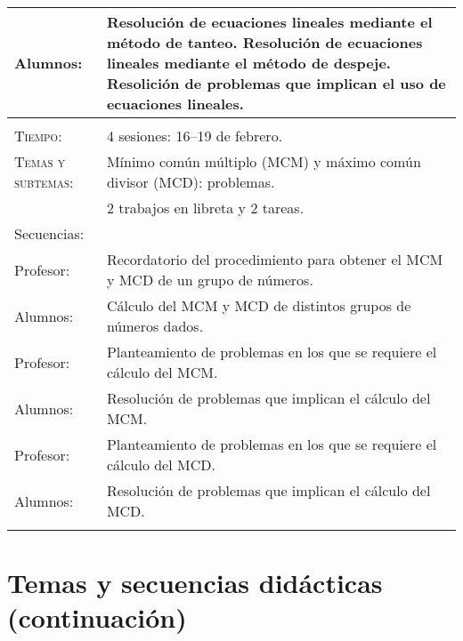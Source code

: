 \documentclass[letterpaper,10pt]{article}
\begin{document}
\begin{tabular}[t]{R{0.25\textwidth}p{0.71\textwidth}}
    Alumnos:    & Resoluci\'on de ecuaciones lineales mediante el m\'etodo de
    tanteo. Resoluci\'on de ecuaciones lineales mediante el m\'etodo de 
    despeje. Resolici\'on de problemas que implican el uso de ecuaciones 
    lineales.
\\ \hline \\
    \textsc{Tiempo:}           & 4 sesiones: 16--19  de febrero. \\
    \textsc{Temas y subtemas:} & M\'inimo com\'un m\'ultiplo (MCM) y m\'aximo com\'un 
    divisor (MCD): problemas. \\
     & 2 trabajos en libreta y 2 tareas. \\
    \large{\sc Secuencias:} \\
    Profesor:    & Recordatorio del procedimiento para obtener el MCM y MCD de 
    un grupo de n\'umeros. \\
    Alumnos:     & C\'alculo del MCM y MCD de distintos grupos de n\'umeros 
    dados. \\
    Profesor:   & Planteamiento de problemas en los que se requiere el c\'alculo 
    del MCM. \\
    Alumnos:    & Resoluci\'on de problemas que implican el c\'alculo del MCM. \\
    Profesor:   & Planteamiento de problemas en los que se requiere el c\'alculo 
    del MCD. \\
    Alumnos:    & Resoluci\'on de problemas que implican el c\'alculo del MCD. 
\\ \hline \\
\end{tabular}

\newpage

\section{Temas  y secuencias did\'acticas (continuaci\'on)}
\end{document}
